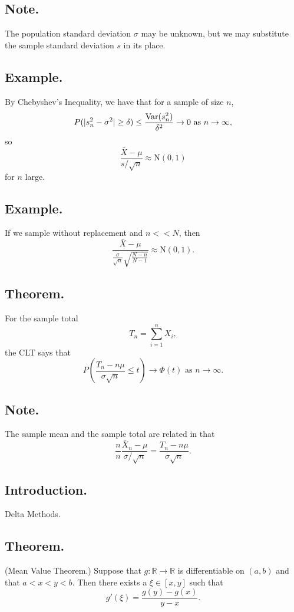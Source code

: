 \documentclass[titlepage]{article}
\begin{document}
\subsection{Note.} The population standard deviation $\sigma$ may be unknown, but we may substitute the sample standard deviation $s$ in its place.

\subsection{Example.} By Chebyshev's Inequality, we have that for a sample of size $n$, 
$$P(|s_{n}^{2} - \sigma^{2}| \geq \delta) \leq \frac{\text{Var}(s_{n}^{2})}{\delta^{2}} \rightarrow 0 \text{ as } n \rightarrow \infty,$$
so 
$$\frac{\bar{X} - \mu}{s/\sqrt{n}} \approx \text{N}(0, 1)$$
for $n$ large.

\subsection{Example.} If we sample without replacement and $n << N$, then 
$$\frac{\bar{X} - \mu}{\frac{\sigma}{\sqrt{n}}\sqrt{\frac{N-n}{N-1}}} \approx \text{N}(0, 1).$$

\subsection{Theorem.} For the sample total 
$$T_{n} = \sum_{i=1}^{n}X_{i},$$
the CLT says that 
$$P\left(\frac{T_{n} - n\mu}{\sigma\sqrt{n}} \leq t\right) \rightarrow \Phi(t) \text{ as } n \rightarrow \infty.$$

\subsection{Note.} The sample mean and the sample total are related in that 
$$\frac{n}{n}\frac{\bar{X}_{n}-\mu}{\sigma/\sqrt{n}} = \frac{T_{n}-n\mu}{\sigma\sqrt{n}}.$$

\newpage {}

\subsection{Introduction.} Delta Methods.

\subsection{Theorem.} (Mean Value Theorem.) Suppose that $g: \mathbb{R} \to \mathbb{R}$ is differentiable on $(a, b)$ and that $a < x < y < b$. Then there exists a $\xi \in [x, y]$ such that 
$$g'(\xi) = \frac{g(y) - g(x)}{y - x}.$$
\end{document}
